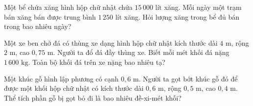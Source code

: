 \begin{ex} %
Một bể chứa xăng hình hộp chữ nhật chứa $15\,000\text{ lít}$ xăng. Mỗi ngày một trạm bán xăng bán được trung bình $1\,250\text{ lít}$ xăng. Hỏi lượng xăng trong bể đủ bán trong bao nhiêu ngày?
\end{ex}

\begin{ex} %
Một xe ben chở đá có thùng xe dạng hình hộp chữ nhật kích thước dài $4\text{ m}$, rộng $2\text{ m}$, cao $0{,}75\text{ m}$. Người ta đổ đá đầy thùng xe. Biết mỗi mét khối đá nặng $1\,600\text{ kg}$. Toàn bộ khối đá trên xe nặng bao nhiêu tạ?
\end{ex}

\begin{ex} %
Một khúc gỗ hình lập phương có cạnh $0{,}6\text{ m}$. Người ta gọt bớt khúc gỗ đó để được một khối hộp chữ nhật có kích thước dài $0{,}6\text{ m}$, rộng $0{,}5\text{ m}$, cao $0{,}4\text{ m}$. Thể tích phần gỗ bị gọt bỏ đi là bao nhiêu đề-xi-mét khối?
\end{ex}
